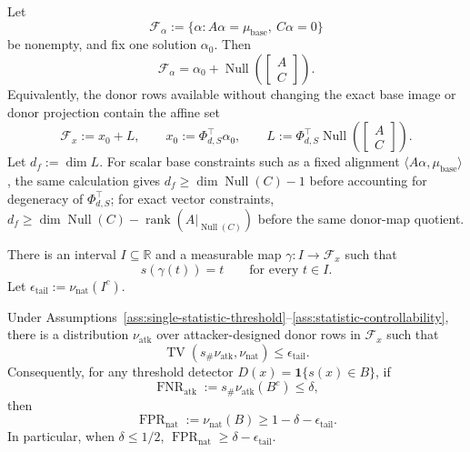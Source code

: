 \begin{assumption}
\label{ass:detector-design-freedom}
Let
\[
\mathcal{F}_{\alpha}
:=
\{\alpha:A\alpha=\mu_{\text{base}},\ C\alpha=0\}
\]
be nonempty, and fix one solution $\alpha_0$. Then
\[
\mathcal{F}_{\alpha}=\alpha_0+\operatorname{Null}\left(\begin{bmatrix}A\\ C\end{bmatrix}\right).
\]
Equivalently, the donor rows available without changing the exact base image or donor projection contain the affine set
\[
\mathcal{F}_{x}
:=
x_0+L,
\qquad
x_0:=\Phi_{d,S}^\top\alpha_0,
\qquad
L:=\Phi_{d,S}^\top\operatorname{Null}\left(\begin{bmatrix}A\\ C\end{bmatrix}\right).
\]
Let $d_f:=\dim L$. For scalar base constraints such as a fixed alignment $\langle A\alpha,\mu_{\text{base}}\rangle$, the same calculation gives $d_f\ge \dim\operatorname{Null}(C)-1$ before accounting for degeneracy of $\Phi_{d,S}^\top$; for exact vector constraints, $d_f\ge \dim\operatorname{Null}(C)-\operatorname{rank}(A|_{\operatorname{Null}(C)})$ before the same donor-map quotient.
\end{assumption}

\begin{assumption}
\label{ass:statistic-controllability}
There is an interval $I\subseteq\mathbb{R}$ and a measurable map $\gamma:I\to\mathcal{F}_x$ such that
\[
s(\gamma(t))=t
\qquad
\text{for every }t\in I.
\]
Let $\epsilon_{\mathrm{tail}}:=\nu_{\mathrm{nat}}(I^c)$.
\end{assumption}

\begin{theorem}
\label{thm:spectral-threshold-lower-bound}
Under Assumptions~\ref{ass:single-statistic-threshold}--\ref{ass:statistic-controllability}, there is a distribution $\nu_{\mathrm{atk}}$ over attacker-designed donor rows in $\mathcal{F}_x$ such that
\[
\operatorname{TV}\left(s_\#\nu_{\mathrm{atk}},\nu_{\mathrm{nat}}\right)
\le
\epsilon_{\mathrm{tail}}.
\]
Consequently, for any threshold detector $D(x)=\mathbf{1}\{s(x)\in B\}$, if
\[
\operatorname{FNR}_{\mathrm{atk}}:=s_\#\nu_{\mathrm{atk}}(B^c)\le \delta,
\]
then
\[
\operatorname{FPR}_{\mathrm{nat}}:=\nu_{\mathrm{nat}}(B)
\ge
1-\delta-\epsilon_{\mathrm{tail}}.
\]
In particular, when $\delta\le 1/2$, $\operatorname{FPR}_{\mathrm{nat}}\ge \delta-\epsilon_{\mathrm{tail}}$.
\end{theorem}

